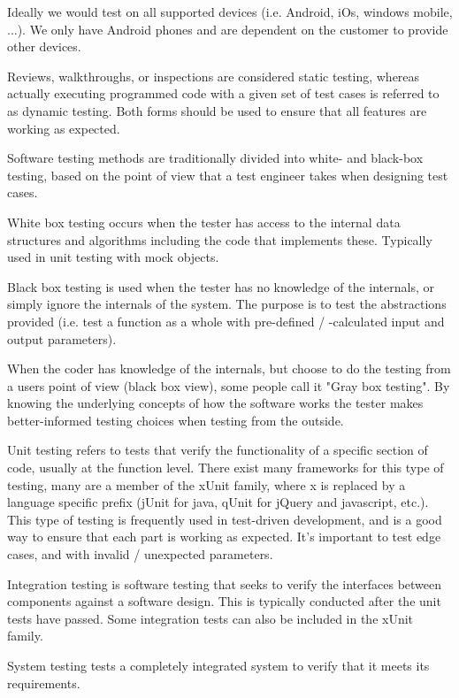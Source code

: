 Ideally we would test on all supported devices (i.e. Android,
iOs, windows mobile, ...). We only have Android phones and are dependent on the
customer to provide other devices.

Reviews, walkthroughs, or inspections are considered static testing, whereas
actually executing programmed code with a given set of test cases is referred to
as dynamic testing. Both forms should be used to ensure that all features are
working as expected.

Software testing methods are traditionally divided into white- and black-box
testing, based on the point of view that a test engineer takes when designing
test cases.

White box testing occurs when the tester has access to the internal data
structures and algorithms including the code that implements these. Typically
used in unit testing with mock objects.

Black box testing is used when the tester has no knowledge of the internals, or
simply ignore the internals of the system. The purpose is to test the
abstractions provided (i.e. test a function as a whole with
pre-defined / -calculated input and output parameters).

When the coder has knowledge of the internals, but choose to do the testing from
a users point of view (black box view), some people call it "Gray box testing".
By knowing the underlying concepts of how the software works the tester makes
better-informed testing choices when testing from the outside.

Unit testing refers to tests that verify the functionality of a specific section
of code, usually at the function level. There exist many frameworks for this
type of testing, many are a member of the xUnit family, where x is replaced by a
language specific prefix (jUnit for java, qUnit for jQuery and javascript, etc.).  
This type of testing is frequently used in test-driven development, and is a
good way to ensure that each part is working as expected. It's important to test
edge cases, and with invalid / unexpected parameters.

Integration testing is software testing that seeks to verify the interfaces
between components against a software design. This is typically conducted after
the unit tests have passed. Some integration tests can also be included in the
xUnit family.

System testing tests a completely integrated system to verify that it meets its
requirements.

